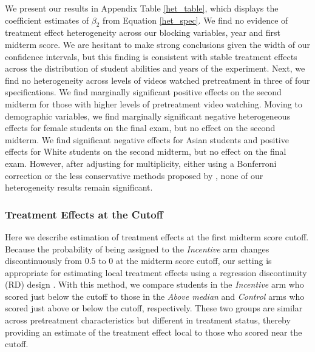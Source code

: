 \documentclass[12pt]{article}
\begin{document}
We present our results in Appendix Table \ref{het_table}, which displays the coefficient estimates of $\beta_2$ from Equation \ref{het_spec}. We find no evidence of treatment effect heterogeneity across our blocking variables, year and first midterm score. We are hesitant to make strong conclusions given the width of our confidence intervals, but this finding is consistent with stable treatment effects across the distribution of student abilities and years of the experiment. Next, we find no heterogeneity across levels of videos watched pretreatment in three of four specifications. We find marginally significant positive effects on the second midterm for those with higher levels of pretreatment video watching. Moving to demographic variables, we find marginally significant negative heterogeneous effects for female students on the final exam, but no effect on the second midterm. We find significant negative effects for Asian students and positive effects for White students on the second midterm, but no effect on the final exam. However, after adjusting for multiplicity, either using a Bonferroni correction or the less conservative methods proposed by \textcite{lsx2019}, none of our heterogeneity results remain significant.

\subsubsection{Treatment Effects at the Cutoff}

Here we describe estimation of treatment effects at the first midterm score cutoff. Because the probability of being assigned to the \textit{Incentive} arm changes discontinuously from 0.5 to 0 at the midterm score cutoff, our setting is appropriate for estimating local treatment effects using a regression discontinuity (RD) design \citep{tc1960, ap2008, il2008}. With this method, we compare students in the \textit{Incentive} arm who scored just below the cutoff to those in the \textit{Above median} and \textit{Control} arms who scored just above or below the cutoff, respectively. These two groups are similar across pretreatment characteristics but different in treatment status, thereby providing an estimate of the treatment effect local to those who scored near the cutoff.
\end{document}
